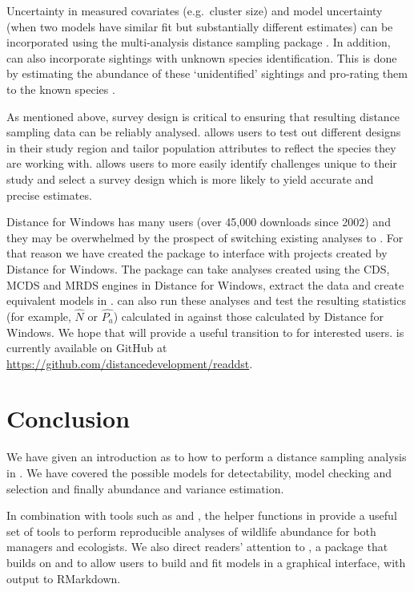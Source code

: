 \documentclass[article,shortnames]{jss}
\begin{document}
Uncertainty in measured covariates (e.g.~cluster size) and model
uncertainty (when two models have similar fit but substantially
different estimates) can be incorporated using the multi-analysis
distance sampling package  \citep{mads-pkg}. In addition,
 can also incorporate sightings with unknown species
identification. This is done by estimating the abundance of these
`unidentified' sightings and pro-rating them to the known species
\citep{Gerrodette:2005}.

As mentioned above, survey design is critical to ensuring that resulting
distance sampling data can be reliably analysed.  allows
users to test out different designs in their study region and tailor
population attributes to reflect the species they are working with.
 \citep{DSsim-pkg} allows users to more easily identify
challenges unique to their study and select a survey design which is
more likely to yield accurate and precise estimates.

Distance for Windows has many users (over 45,000 downloads since 2002)
and they may be overwhelmed by the prospect of switching existing
analyses to . For that reason we have created the
 \citep{readdst-pkg} package to interface with projects
created by Distance for Windows. The package can take analyses created
using the CDS, MCDS and MRDS engines in Distance for Windows, extract
the data and create equivalent models in .  can
also run these analyses and test the resulting statistics (for example,
\(\hat{N}\) or \(\hat{P_a}\)) calculated in  against those
calculated by Distance for Windows. We hope that  will
provide a useful transition to  for interested users.
 is currently available on GitHub at
\url{https://github.com/distancedevelopment/readdst}.

\section{Conclusion}\label{conclusion}

We have given an introduction as to how to perform a distance sampling
analysis in . We have covered the possible models for
detectability, model checking and selection and finally abundance and
variance estimation.

In combination with tools such as  and 
\citep{rmarkdown-pkg}, the helper functions in  provide a
useful set of tools to perform reproducible analyses of wildlife
abundance for both managers and ecologists. We also direct readers'
attention to  \citep{dsshiny-pkg}, a package that builds on
 \citep{shiny-pkg} and  to allow users to build and
fit models in a graphical interface, with output to RMarkdown.
\end{document}
